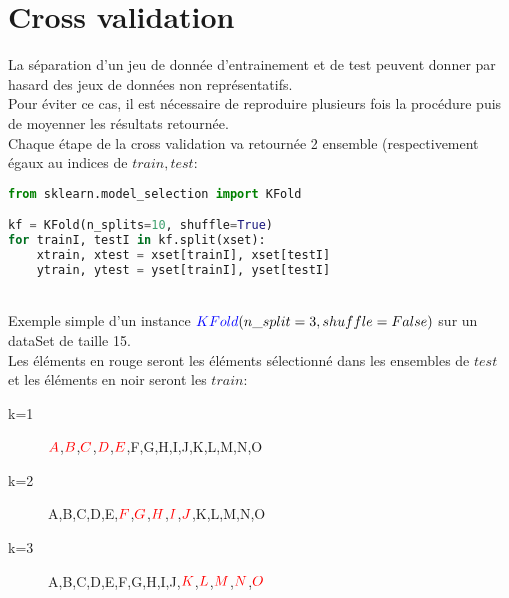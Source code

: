 \section{Cross validation}
La séparation d'un jeu de donnée d'entrainement et de test peuvent donner par hasard des jeux de données non représentatifs.\\
Pour éviter ce cas, il est nécessaire de reproduire plusieurs fois la procédure puis de moyenner les résultats retournée.\\
Chaque étape de la cross validation va retournée 2 ensemble (respectivement égaux au indices de $train,test$:\\

\lstset{style=mlpythoncode}
\begin{lstlisting}[language=Python]
from sklearn.model_selection import KFold

kf = KFold(n_splits=10, shuffle=True)
for trainI, testI in kf.split(xset):
    xtrain, xtest = xset[trainI], xset[testI]
    ytrain, ytest = yset[trainI], yset[testI]
\end{lstlisting}
\ \\
Exemple simple d'un instance $\textcolor{blue}{KFold}(n\_split=3, shuffle=False)$ sur un dataSet de taille 15.\\
Les éléments en rouge seront les éléments sélectionné dans les ensembles de $test$ et les éléments en noir seront les $train$:\\
\begin{description}
\item[k=1] $\textcolor{red}{A}$,$\textcolor{red}{B}$,$\textcolor{red}{C}$,$\textcolor{red}{D}$,$\textcolor{red}{E}$,F,G,H,I,J,K,L,M,N,O
\item[k=2] A,B,C,D,E,$\textcolor{red}{F}$,$\textcolor{red}{G}$,$\textcolor{red}{H}$,$\textcolor{red}{I}$,$\textcolor{red}{J}$,K,L,M,N,O
\item[k=3] A,B,C,D,E,F,G,H,I,J,$\textcolor{red}{K}$,$\textcolor{red}{L}$,$\textcolor{red}{M}$,$\textcolor{red}{N}$,$\textcolor{red}{O}$
\end{description}



